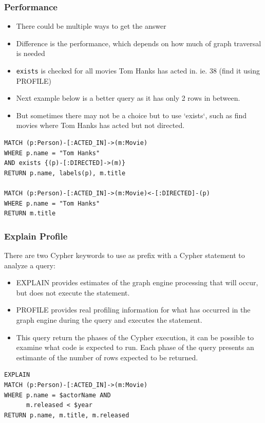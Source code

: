 \begin{frame}[fragile]\frametitle{Performance}

\begin{itemize}
\item There could be multiple ways to get the answer
\item Difference is the performance, which depends on how much of graph traversal is needed
\item \lstinline|exists| is checked for all movies Tom Hanks has acted in. ie. 38 (find it using PROFILE)
\item Next example below is a better query as it has only 2 rows in between.
\item But sometimes there may not be a choice but to use `exists`, such as find movies where Tom Hanks has acted but not directed.
\end{itemize}

\begin{lstlisting}
MATCH (p:Person)-[:ACTED_IN]->(m:Movie)
WHERE p.name = "Tom Hanks"
AND exists {(p)-[:DIRECTED]->(m)}
RETURN p.name, labels(p), m.title

MATCH (p:Person)-[:ACTED_IN]->(m:Movie)<-[:DIRECTED]-(p)
WHERE p.name = "Tom Hanks"
RETURN m.title
\end{lstlisting}

\end{frame}


\begin{frame}[fragile]\frametitle{Explain Profile}

There are two Cypher keywords to use as prefix with a Cypher statement to analyze a query:
\begin{itemize}
\item EXPLAIN provides estimates of the graph engine processing that will occur, but does not execute the statement.
\item PROFILE provides real profiling information for what has occurred in the graph engine during the query and executes the statement.
\item This query return the phases of the Cypher execution, it can be possible to examine what code is expected to run. Each phase of the query presents an estimante of the number of rows expected to be returned.
\end{itemize}

\begin{lstlisting}
EXPLAIN
MATCH (p:Person)-[:ACTED_IN]->(m:Movie)
WHERE p.name = $actorName AND
      m.released < $year
RETURN p.name, m.title, m.released

\end{lstlisting}

\end{frame}


